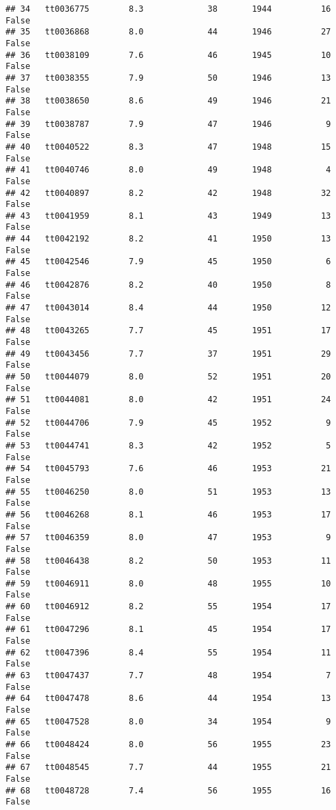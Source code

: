 \documentclass[
]{article}
\begin{document}
\begin{verbatim}
## 34   tt0036775        8.3             38       1944          16   False
## 35   tt0036868        8.0             44       1946          27   False
## 36   tt0038109        7.6             46       1945          10   False
## 37   tt0038355        7.9             50       1946          13   False
## 38   tt0038650        8.6             49       1946          21   False
## 39   tt0038787        7.9             47       1946           9   False
## 40   tt0040522        8.3             47       1948          15   False
## 41   tt0040746        8.0             49       1948           4   False
## 42   tt0040897        8.2             42       1948          32   False
## 43   tt0041959        8.1             43       1949          13   False
## 44   tt0042192        8.2             41       1950          13   False
## 45   tt0042546        7.9             45       1950           6   False
## 46   tt0042876        8.2             40       1950           8   False
## 47   tt0043014        8.4             44       1950          12   False
## 48   tt0043265        7.7             45       1951          17   False
## 49   tt0043456        7.7             37       1951          29   False
## 50   tt0044079        8.0             52       1951          20   False
## 51   tt0044081        8.0             42       1951          24   False
## 52   tt0044706        7.9             45       1952           9   False
## 53   tt0044741        8.3             42       1952           5   False
## 54   tt0045793        7.6             46       1953          21   False
## 55   tt0046250        8.0             51       1953          13   False
## 56   tt0046268        8.1             46       1953          17   False
## 57   tt0046359        8.0             47       1953           9   False
## 58   tt0046438        8.2             50       1953          11   False
## 59   tt0046911        8.0             48       1955          10   False
## 60   tt0046912        8.2             55       1954          17   False
## 61   tt0047296        8.1             45       1954          17   False
## 62   tt0047396        8.4             55       1954          11   False
## 63   tt0047437        7.7             48       1954           7   False
## 64   tt0047478        8.6             44       1954          13   False
## 65   tt0047528        8.0             34       1954           9   False
## 66   tt0048424        8.0             56       1955          23   False
## 67   tt0048545        7.7             44       1955          21   False
## 68   tt0048728        7.4             56       1955          16   False

\end{verbatim}
\end{document}
